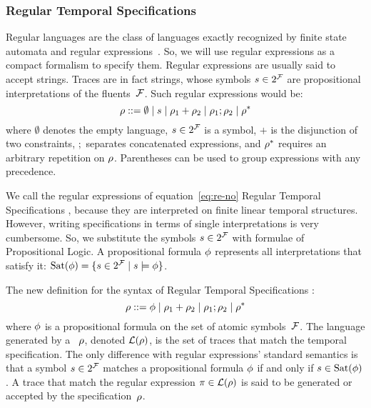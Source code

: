\subsubsection{Regular Temporal Specifications}

Regular languages are the class of languages exactly recognized by finite
state automata and regular expressions~\cite{bib:languages-book}. So, we will
use regular expressions as a compact formalism to specify them. Regular
expressions are usually said to accept strings. Traces are in fact strings,
whose symbols $s \in 2^{\mathcal{F}}$ are propositional interpretations of the
fluents~$\mathcal{F}$. Such regular expressions would be:
\begin{equation}
	\rho ::= \emptyset \mid s \mid
	\rho_1 + \rho_2 \mid \rho_1 ; \rho_2 \mid \rho^*
	\label{eq:re-no}
\end{equation}
where $\emptyset$ denotes the empty language, $s \in 2^{\mathcal{F}}$ is a symbol,
$+$ is the disjunction of two constraints, $;$ separates concatenated
expressions, and $\rho^*$ requires an arbitrary repetition on $\rho$.
Parentheses can be used to group expressions with any precedence.

We call the regular expressions of equation~\eqref{eq:re-no} Regular Temporal
Specifications \re{}, because they are interpreted on finite linear temporal
structures. However, writing specifications in terms of single interpretations
is very cumbersome. So, we substitute the symbols $s \in 2^{\mathcal{F}}$ with
formulae of Propositional Logic. A propositional formula $\phi$
represents all interpretations that satisfy it: $\text{Sat}(\phi) = \{s
\in 2^{\mathcal{F}} \mid s \models \phi\}$.

The new definition for the syntax of Regular Temporal Specifications \re{}:
\begin{equation}
	\rho ::= \phi \mid
	\rho_1 + \rho_2 \mid \rho_1 ; \rho_2 \mid \rho^*
	\label{eq:re}
\end{equation}
where $\phi$ is a propositional formula on the set of atomic
symbols~$\mathcal{F}$. The language generated by a \re{}~$\rho$, denoted
$\mathcal{L}(\rho)$, is the set of traces that match the temporal
specification. The only difference with regular expressions' standard
semantics is that a symbol $s \in 2^{\mathcal{F}}$ matches a propositional formula
$\phi$ if and only if $s \in \text{Sat}(\phi)$. A trace that
match the regular expression $\pi \in \mathcal{L}(\rho)$ is said to be
generated or accepted by the specification~$\rho$.

